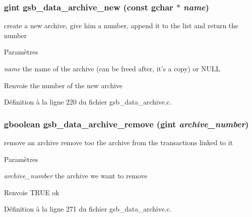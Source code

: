 \subsubsection[{gsb\_\-data\_\-archive\_\-new}]{\setlength{\rightskip}{0pt plus 5cm}gint gsb\_\-data\_\-archive\_\-new (const gchar $\ast$ {\em name})}\label{gsb__data__archive_8h_af867698152bb736c36b4d02ec8a5b173}
create a new archive, give him a number, append it to the list and return the number


\begin{DoxyParams}{Paramètres}
\item[{\em name}]the name of the archive (can be freed after, it's a copy) or NULL\end{DoxyParams}
\begin{DoxyReturn}{Renvoie}
the number of the new archive 
\end{DoxyReturn}


Définition à la ligne 220 du fichier gsb\_\-data\_\-archive.c.

\subsubsection[{gsb\_\-data\_\-archive\_\-remove}]{\setlength{\rightskip}{0pt plus 5cm}gboolean gsb\_\-data\_\-archive\_\-remove (gint {\em archive\_\-number})}\label{gsb__data__archive_8h_a29c34a3d5e63dd56c7120e8ac464b204}
remove an archive remove too the archive from the transactions linked to it


\begin{DoxyParams}{Paramètres}
\item[{\em archive\_\-number}]the archive we want to remove\end{DoxyParams}
\begin{DoxyReturn}{Renvoie}
TRUE ok 
\end{DoxyReturn}


Définition à la ligne 271 du fichier gsb\_\-data\_\-archive.c.

